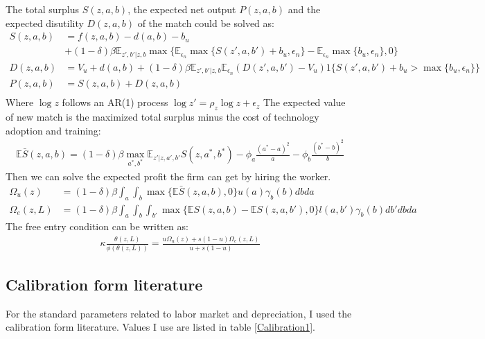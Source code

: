 \documentclass[12pt]{article}
\newcommand{\E}{\mathbb{E}}
\newcommand{\1}{\mathbb{1}}
\begin{document}
The total surplus $S(z,a,b)$, the expected net output $P(z,a,b)$ and the expected disutility $D(z,a,b)$ of the match could be solved as: 
\begin{align*}
S(z,a,b) &= f(z,a,b)-d(a,b)-b_u \\
			 &+(1-\delta)\beta \E_{z',b'|z,b}\max\{\E_{\epsilon_n}\max\{S(z',a,b')+b_u,\epsilon_n\}-\E_{\epsilon_n}\max\{b_u,\epsilon_n\},0 \}  \\
D(z,a,b) &=V_u+d(a,b)+(1-\delta)\beta \E_{z',b'|z,b}\E_{\epsilon_n}(D(z',a,b')-V_u)1\{{S(z',a,b')+b_u>\max\{b_u,\epsilon_n\}}\} \\
P(z,a,b) &= S(z,a,b)+D(z,a,b) \\
\end{align*}
Where $\log z$ follows an AR(1) process $\log z' = \rho_z \log z +\epsilon_z$
The expected value of new match is the maximized total surplus minus the cost of technology adoption and training: 
\begin{align*}
\E\bar{S}(z,a,b) = (1-\delta)\beta\max _{a^*,b^*}  \E_{z'|z,a',b'}S(z,a^*,b^*)-\phi_a\frac{(a^*-a)^2}{a}-\phi_b\frac{(b^*-b)^2}{b}
\end{align*}
Then we can solve the expected profit the firm can get by hiring the worker. 
\begin{align*}
\Omega_u(z) &= (1-\delta)\beta\int_a \int_b \max\{\E\bar{S}(z,a,b),0\}u(a)\gamma_b(b)dbda \\
\Omega_e(z,L) &= (1-\delta)\beta\int_a\int_b\int_{b'}\max\{\E S(z,a,b)-\E S(z,a,b'),0\}l(a,b')\gamma_b(b)db'dbda 
\end{align*}
The free entry condition can be written as: 
\begin{align*}
\kappa \frac{\theta(z,L)}{\phi(\theta(z,L))} =  \frac{u \Omega_u(z)+s(1-u)\Omega_e(z,L)}{u+s(1-u)} 
\end{align*}

\subsection{Calibration form literature}
For the standard parameters related to labor market and depreciation, I used the calibration form literature. Values I use are listed in table \ref{Calibration1}. \\
\end{document}
